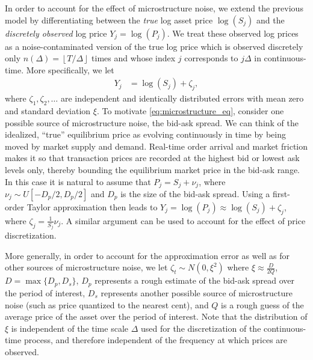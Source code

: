 In order to account for the effect of microstructure noise, we extend the previous model by differentiating between the \textit{true} log asset price $\log(S_j)$ and the \textit{discretely observed} log price $Y_j = \log(P_j)$. We treat these observed log prices as a noise-contaminated version of the true log price which is observed discretely only $n(\Delta) = \left\lfloor T/\Delta \right\rfloor$ times and whose index $j$ corresponds to $j\Delta$ in continuous-time.  More specifically, we let
\begin{align}\label{eq:microstructure_eq}
  Y_j &= \log (S_j) + \zeta_j,
\end{align}
where $\zeta_1, \zeta_2, \ldots$ are independent and identically distributed errors with mean zero and standard deviation $\xi$.  To motivate \eqref{eq:microstructure_eq}, consider one possible source of microstructure noise, the bid-ask spread. We can think of the idealized, ``true'' equilibrium price as evolving continuously in time by being moved by market supply and demand. Real-time order arrival and market friction makes it so that transaction prices are recorded at the highest bid or lowest ask levels only, thereby bounding the equilibrium market price in the bid-ask range. In this case it is natural to assume that $P_j = S_j + \nu_j$, where $\nu_j \sim U[ - D_p/2, D_p/2]$ and $D_p$ is the size of the bid-ask spread.  Using a first-order Taylor approximation then leads to $Y_j = \log(P_j) \approx \log(S_j) + \zeta_j$, where $\zeta_j = \frac{1}{S_j}\nu_j$.  A similar argument can be used to account for the effect of price discretization.

More generally, in order to account for the approximation error as well as for other sources of microstructure noise, we let $\zeta_t \sim N (0, \xi^2)$ where $\xi \approx \frac{D}{2Q}$, $D = \max\{ D_p, D_s\}$, $D_p$ represents a rough estimate of the bid-ask spread over the period of interest, $D_s$ represents another possible source of microstructure noise (such as price quantized to the nearest cent), and $Q$ is a rough guess of the average price of the asset over the period of interest.  Note that the distribution of $\xi$ is independent of the time scale $\Delta$ used for the discretization of the continuous-time process, and therefore independent of the frequency at which prices are observed.

